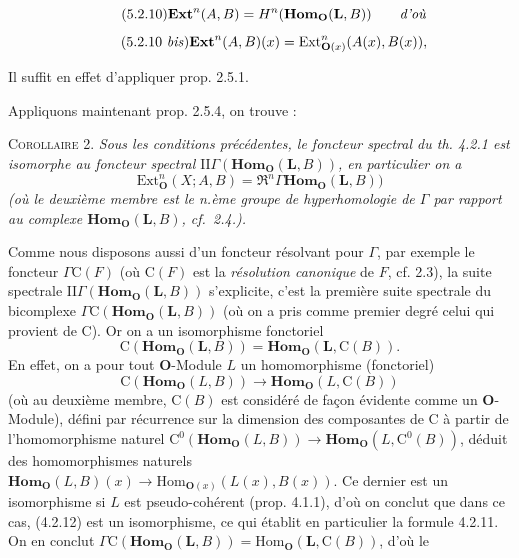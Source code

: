 \clearpage
{}

\[
\tag{5.2.10}
\mathbf{Ext}^n(A,B)=H^n(\mathbf{Hom}_{\mathbf O}(\mathbf{L},B))\qquad\text{\textit{d'où}}
\]
\[
\tag{5.2.10 \textit{bis}}
\mathbf{Ext}^n(A,B)(x)=
\mathrm{Ext}_{{\mathbf O}(x)}^n(A(x),B(x)),
\]

Il suffit en effet d'appliquer prop. 2.5.1.

Appliquons maintenant prop. 2.5.4, on trouve :

\textsc{Corollaire 2.} \textit{Sous les conditions précédentes, le
foncteur spectral du th. \textup{4.2.1} est isomorphe au foncteur spectral
$\mathrm{II}\Gamma(\mathbf{Hom}_{\mathbf O}(\mathbf{L},B))$, en particulier on a}
\[
\mathrm{Ext}_{\mathbf O}^n(X;A,B)=
\mathfrak{R}^n\Gamma\mathbf{Hom}_{\mathbf O}(\mathbf{L},B))
\]
\textit{\textup{(}où le deuxième membre est le n.ème groupe de hyperhomologie de
$\Gamma$ par rapport au complexe $\mathbf{Hom}_{\mathbf O}(\mathbf{L},B)$, cf.\ \textup{2.4.).}}

Comme nous disposons aussi d'un foncteur résolvant pour $\Gamma$, par exemple
le foncteur $\Gamma {\mathrm C}(F)$ (où ${\mathrm C}(F)$ est la \textit{résolution canonique} de
$F$, cf. 2.3), la suite spectrale
$\mathrm{II}\Gamma(\mathbf{Hom}_{\mathbf O}(\mathbf{L},B))$ s'explicite, c'est la première suite
spectrale du bicomplexe $\Gamma {\mathrm C}(\mathbf{Hom}_{\mathbf O}(\mathbf{L},B))$ (où on a pris
comme premier degré celui qui provient de ${\mathrm C}$). Or on a un isomorphisme
fonctoriel
\[
\tag{4.2.11}
{\mathrm C}(\mathbf{Hom}_{\mathbf O}(\mathbf{L},B))=
\mathbf{Hom}_{\mathbf O}(\mathbf{L},{\mathrm C}(B)).
\]
En effet, on a pour tout ${\mathbf O}$-Module $L$ un homomorphisme (fonctoriel)
\[
\tag{4.2.12}
{\mathrm C}(\mathbf{Hom}_{\mathbf O}(L,B))\to\mathbf{Hom}_{\mathbf O}(L,{\mathrm C}(B))
\]
(où au deuxième membre, ${\mathrm C}(B)$ est considéré de façon évidente comme un
${\mathbf O}$-Module), défini par récurrence sur la dimension des composantes de ${\mathrm C}$ à
partir de l'homomorphisme naturel
${\mathrm C}^0(\mathbf{Hom}_{\mathbf O}(L,B))\to\mathbf{Hom}_{\mathbf O}(L,{\mathrm C}^0(B))$, déduit des
homomorphismes naturels
$\mathbf{Hom}_{\mathbf O}(L,B)(x)\to
\mathrm{Hom}_{{\mathbf O}(x)}(L(x),B(x))$. Ce dernier est un isomorphisme si $L$ est
pseudo-cohérent (prop. 4.1.1), d'où on conclut que dans ce cas, (4.2.12) est un
isomorphisme, ce qui établit en particulier la formule 4.2.11. On en conclut
$\Gamma {\mathrm C}(\mathbf{Hom}_{\mathbf O}(\mathbf{L},B))=
\mathrm{Hom}_{\mathbf O}(\mathbf{L},{\mathrm C}(B))$, d'où le


